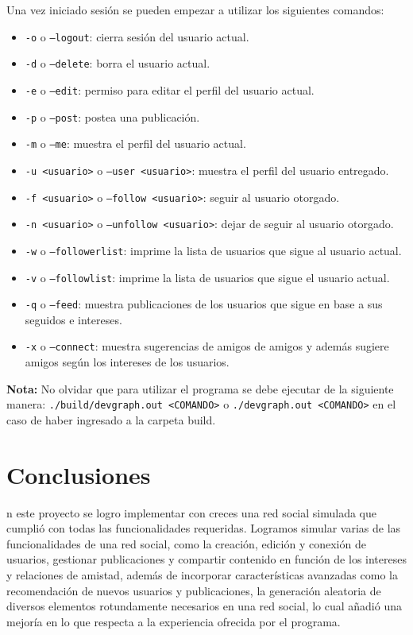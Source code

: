 \documentclass[9pt,letterpaper,onecolumn]{rho-class/rho}
\begin{document}
Una vez iniciado sesión se pueden empezar a utilizar los siguientes comandos:
\begin{itemize}
	\item \texttt{-o} o \texttt{--logout}: cierra sesión del usuario actual.
	\item \texttt{-d} o \texttt{--delete}: borra el usuario actual.
	\item \texttt{-e} o \texttt{--edit}: permiso para editar el perfil del usuario actual.
	\item \texttt{-p} o \texttt{--post}: postea una publicación.
	\item \texttt{-m} o \texttt{--me}: muestra el perfil del usuario actual.
	\item \texttt{-u <usuario>} o \texttt{--user <usuario>}: muestra el perfil del usuario entregado.
	\item \texttt{-f <usuario>} o \texttt{--follow <usuario>}: seguir al usuario otorgado.
	\item \texttt{-n <usuario>} o \texttt{--unfollow <usuario>}: dejar de seguir al usuario otorgado.
	\item \texttt{-w} o \texttt{--followerlist}: imprime la lista de usuarios que sigue al usuario actual.
	\item \texttt{-v} o \texttt{--followlist}: imprime la lista de usuarios que sigue el usuario actual.
	\item \texttt{-q} o \texttt{--feed}: muestra publicaciones de los usuarios que sigue en base a sus seguidos e intereses.
	\item \texttt{-x} o \texttt{--connect}: muestra sugerencias de amigos de amigos y además sugiere amigos según los intereses de los usuarios.
\end{itemize}

\textbf{Nota:} No olvidar que para utilizar el programa se debe ejecutar de la siguiente manera: \texttt{./build/devgraph.out <COMANDO>} o \texttt{./devgraph.out <COMANDO>} en el caso de haber ingresado a la carpeta build.
    
\newpage
\section{Conclusiones}
n este proyecto se logro implementar con creces una red social simulada que cumplió con todas las funcionalidades requeridas. Logramos simular varias de las funcionalidades de una red social, como la creación, edición y conexión de usuarios, gestionar publicaciones y compartir contenido en función de los intereses y relaciones de amistad, además de incorporar características avanzadas como la recomendación de nuevos usuarios y publicaciones, la generación aleatoria de diversos elementos rotundamente necesarios en una red social, lo cual añadió una mejoría en lo que respecta a la experiencia ofrecida por el programa. 
\end{document}
